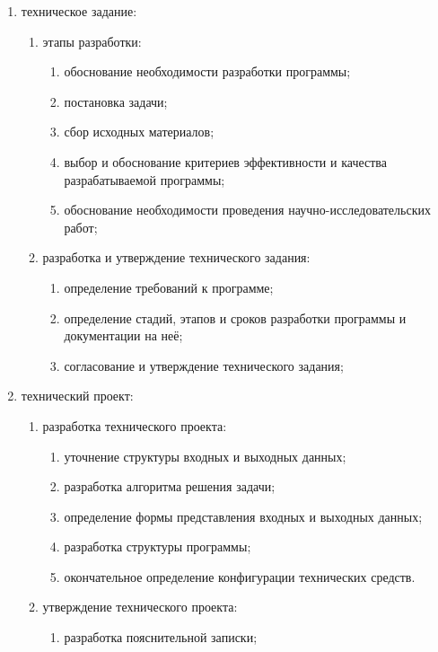 \begin{enumerate}
    \item техническое задание:
    \begin{enumerate}
        \item этапы разработки:
        \begin{enumerate}
            \item обоснование необходимости разработки программы; 
            \item постановка задачи; 
            \item сбор исходных материалов; 
            \item выбор и обоснование критериев эффективности и качества разрабатываемой программы; 
            \item обоснование необходимости проведения научно-исследовательских работ; 
        \end{enumerate}
        \item разработка и утверждение технического задания:
        \begin{enumerate}
            \item определение требований к программе; 
            \item определение стадий, этапов и сроков разработки программы и документации на неё; 
            \item согласование и утверждение технического задания; 
        \end{enumerate}
    \end{enumerate}
\item технический проект:
\begin{enumerate}
    \item разработка технического проекта:
    \begin{enumerate}
        \item уточнение структуры входных и выходных данных; 
        \item разработка алгоритма решения задачи; 
        \item определение формы представления входных и выходных данных; 
        \item разработка структуры программы; 
        \item окончательное определение конфигурации технических средств. 
    \end{enumerate}
    \item утверждение технического проекта:
    \begin{enumerate}
        \item разработка пояснительной записки; 

\end{enumerate}
\end{enumerate}
\end{enumerate}
